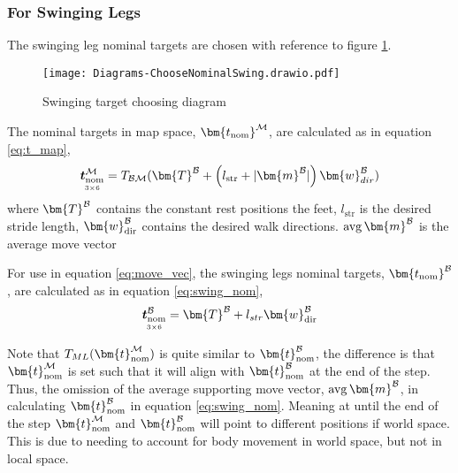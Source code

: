             \subsubsection{For Swinging Legs} \label{sec:swing}
                The swinging leg nominal targets are chosen with reference to figure \ref{fig:swinging_targ}.
                \begin{figure}[h]
                    \centering
                    \texttt{[image: Diagrams-ChooseNominalSwing.drawio.pdf]}
                    \caption{Swinging target choosing diagram} 
                    \label{fig:swinging_targ}
                \end{figure}

                \noindent
                The nominal targets in map space, \(\bm{t_\text{nom}} ^{\fmap}\), are calculated as in equation \ref{eq:t_map},
                \begin{equation} \label{eq:t_map}
                    \mdim{\boldsymbol{t}_\text{nom}^{\fmap}}{3}{6} = \transframe{\bm{T}^\fbody + \left(l_\text{str}+|\bm{m}^\fbody|\right)\bm{w}_{dir}^\fbody}{\fbody}{\fmap}
                \end{equation}
                where \(\bm{T}^\fbody\) contains the constant rest positions the feet, \(l_\text{str}\) is the desired stride length, \(\bm{w}_\text{dir}^\fbody\)
                contains the desired walk directions. \(\avg\bm{m}^\fbody\) is the average move vector 

                For use in equation \ref{eq:move_vec}, the swinging legs nominal targets, \(\bm{t_\text{nom}} ^\fbody\), are calculated as 
                in equation \ref{eq:swing_nom},
                \begin{equation} \label{eq:swing_nom}
                    \mdim{\boldsymbol{t}_\text{nom}^\fbody}{3}{6} = \bm{T}^\fbody + l_{str}\bm{w}_\text{dir}^\fbody
                \end{equation}

                Note that \(\transframe{\bm{t}_\text{nom}^{\fmap}}{M}{L}\) is quite similar to \(\bm{t}_\text{nom}^\fbody\), the difference is that \(\bm{t}_\text{nom}^{\fmap}\) is set such that it
                will align with \(\bm{t}_\text{nom}^\fbody\)
                at the end of the step. Thus, the omission of the average supporting move vector, \(\avg \bm{m}^\fbody\), in calculating \(\bm{t}_\text{nom}^\fbody\)
                in equation \ref{eq:swing_nom}.
                Meaning at until the end of the step \(\bm{t}_\text{nom}\inrefframe{M}\) and \(\bm{t}_\text{nom}^\fbody\) will point 
                to different positions if world space. This is due to needing to account for body movement in world space, but not in local space.

